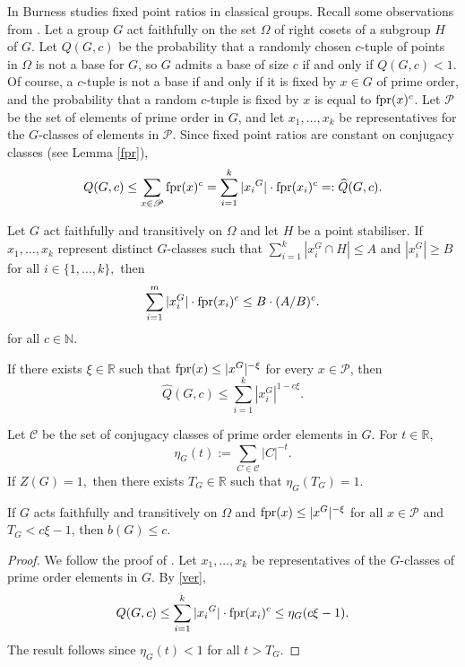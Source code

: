  In \cite{fpr, fpr2, fpr3, fpr4} Burness studies   fixed point ratios in classical groups. Recall some  observations from \cite{fpr}.
Let a group $G$ act faithfully   on the set $\Omega$ of right cosets of a subgroup $H$ of $G.$  
Let $Q(G, c)$ be the probability that
a randomly chosen $c$-tuple of points in $\Omega$ is not a base for $G$, so $G$ admits a base of size $c$ if and
only if $Q(G, c) < 1$. Of course, a $c$-tuple is not a  base if and only if it is fixed by  $x \in G$ of prime order, and the probability that a random $c$-tuple is fixed
by $x$ is equal to ${\mathrm{fpr}}(x)^c$. Let $\mathscr{P}$ be the set of elements of prime order in ${G}$, and let ${x}_1, \ldots, {x}_k$
be representatives for the ${G}$-classes of elements in $\mathscr{P}$. Since  fixed point
ratios are constant on conjugacy classes (see Lemma \ref{fpr}), 
\begin{equation}\label{ver}
Q(G,c) \le \sum_{{x} \in \mathscr{P}}{\mathrm{fpr}}({x})^c = \sum_{i=1}^{k}|{x_i}^{{G}}|\cdot{\mathrm{fpr}}({x}_i)^c=:\widehat{Q}(G,c).
\end{equation}

 
\begin{Lem}
\label{fprAB}
Let $G$ act faithfully and transitively on $\Omega$ and let $H$ be a point stabiliser. If  $x_1,\ldots,x_k$ represent distinct $G$-classes such that $\sum_{i=1}^k |x_i^G \cap  H| \le A$ and $|x_i^G| \ge B$ for all $i \in \{1, \ldots, k\},$ then
$$\sum_{i=1}^m |x_i^G| \cdot {\mathrm{fpr}} (x_i)^c \le B \cdot (A/B)^c.$$ 
for all $c \in \mathbb{N}.$
\end{Lem}


If there exists $\xi \in \mathbb{R}$ such that ${\mathrm{fpr}}({x})\le |{x}^{{G}}|^{-\xi}$ for every  ${x} \in \mathscr{P}$,  then  
$$\widehat{Q}(G,c)\le \sum_{i=1}^{k}|{x}_i^{{G}}|^{1-c\xi}.$$



\begin{Def}
Let $\mathscr{C}$ be the set of conjugacy classes of prime order elements in ${G}$.
For $t \in \mathbb{R},$ 
$$\eta_G(t):= \sum_{C \in \mathscr{C}}|C|^{-t}.$$
If $Z(G)=1,$ then there exists $T_G \in \mathbb{R}$ such that $\eta_G(T_G) = 1.$
\end{Def}





\begin{Lem}\label{11}
	If $G$ acts faithfully and transitively on $\Omega$ and  ${\mathrm{fpr}}({x})\le|{x}^{{G}}|^{-\xi}$ for all  ${x} \in \mathscr{P}$ and $T_G < c\xi - 1$, then $b(G) \le c$.
\end{Lem}
\begin{proof}
We follow the proof of \cite[Proposition 2.1]{burness}. Let ${x}_1, \ldots, {x}_k$ be representatives of the ${G}$-classes
of prime order elements in ${G}$. %
By \eqref{ver}, 
$$Q(G,c) \le  \sum_{i=1}^{k}|{x_i}^{{G}}|\cdot {\mathrm{fpr}}({x}_i)^c \le \eta_G(c\xi - 1).$$
The result follows since $\eta_G(t) < 1$ for all $t>T_G.$
\end{proof}

